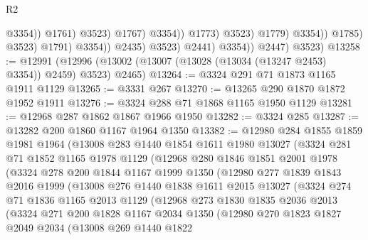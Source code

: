 \begin{lexlean}{R2}
\begin{coremodule}
                                                    @3354))
                                                @1761)
                                              @3523)
                                            @1767)
                                          @3354))
                                      @1773)
                                    @3523)
                                  @1779)
                                @3354))
                            @1785)
                          @3523)
                        @1791)
                      @3354))
                  @2435)
                @3523)
              @2441)
            @3354))
        @2447)
      @3523)
@13258 := @12991 (@12996 (@13002 (@13007 (@13028 (@13034 (@13247 @2453) @3354)) @2459) @3523) @2465)
@13264 := @3324 @291 @71 @1873 @1165 @1911 @1129
@13265 := @3331 @267
@13270 := @13265 @290 @1870 @1872 @1952 @1911
@13276 := @3324 @288 @71 @1868 @1165 @1950 @1129
@13281 := @12968 @287 @1862 @1867 @1966 @1950
@13282 := @3324 @285
@13287 := @13282 @200 @1860 @1167 @1964 @1350
@13382 := @12980
    @284
    @1855
    @1859
    @1981
    @1964
    (@13008
      @283
      @1440
      @1854
      @1611
      @1980
      @13027
      (@3324
        @281
        @71
        @1852
        @1165
        @1978
        @1129
        (@12968
          @280
          @1846
          @1851
          @2001
          @1978
          (@3324
            @278
            @200
            @1844
            @1167
            @1999
            @1350
            (@12980
              @277
              @1839
              @1843
              @2016
              @1999
              (@13008
                @276
                @1440
                @1838
                @1611
                @2015
                @13027
                (@3324
                  @274
                  @71
                  @1836
                  @1165
                  @2013
                  @1129
                  (@12968
                    @273
                    @1830
                    @1835
                    @2036
                    @2013
                    (@3324
                      @271
                      @200
                      @1828
                      @1167
                      @2034
                      @1350
                      (@12980
                        @270
                        @1823
                        @1827
                        @2049
                        @2034
                        (@13008
                          @269
                          @1440
                          @1822

\end{coremodule}
\end{lexlean}
